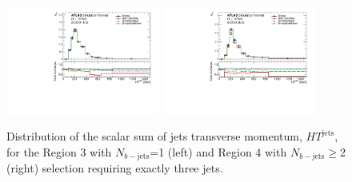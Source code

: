 \begin{figure}[!htb]
\centering
\includegraphics[width=0.45\textwidth]{Plots/ttV/generator/c_Region_2_HT_jets}
\includegraphics[width=0.45\textwidth]{Plots/ttV/generator/c_Region_3_HT_jets}\\
  \caption{Distribution of the scalar sum of jets transverse momentum, $HT^{\text{jets}}$, for the Region 3 with $N_{b-\mathrm{jets}}$=1 (left) and Region 4 with $N_{b-\mathrm{jets}}\geq$2 (right) selection requiring exactly three jets.  \label{ttV:den_3j12b}}
\end{figure}


